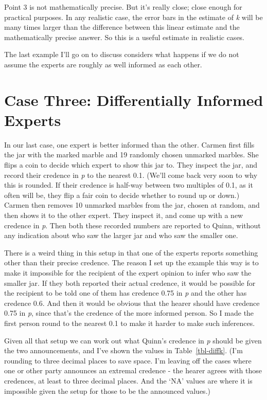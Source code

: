 \documentclass[
  11pt,
  letterpaper,
  DIV=11,
  numbers=noendperiod,
  twoside]{scrartcl}
\begin{document}
Point 3 is not mathematically precise. But it's really close; close
enough for practical purposes. In any realistic case, the error bars in
the estimate of \emph{k} will be many times larger than the difference
between this linear estimate and the mathematically precise answer. So
this is a useful estimate in realistic cases.

The last example I'll go on to discuss considers what happens if we do
not assume the experts are roughly as well informed as each other.

\section{Case Three: Differentially Informed
Experts}\label{sec-diffinfo}

In our last case, one expert is better informed than the other. Carmen
first fills the jar with the marked marble and 19 randomly chosen
unmarked marbles. She flips a coin to decide which expert to show this
jar to. They inspect the jar, and record their credence in \emph{p} to
the nearest 0.1. (We'll come back very soon to why this is rounded. If
their credence is half-way between two multiples of 0.1, as it often
will be, they flip a fair coin to decide whether to round up or down.)
Carmen then removes 10 unmarked marbles from the jar, chosen at random,
and then shows it to the other expert. They inspect it, and come up with
a new credence in \emph{p}. Then both these recorded numbers are
reported to Quinn, without any indication about who saw the larger jar
and who saw the smaller one.

There is a weird thing in this setup in that one of the experts reports
something other than their precise credence. The reason I set up the
example this way is to make it impossible for the recipient of the
expert opinion to infer who saw the smaller jar. If they both reported
their actual credence, it would be possible for the recipient to be told
one of them has credence 0.75 in \emph{p} and the other has credence
0.6. And then it would be obvious that the hearer should have credence
0.75 in \emph{p}, since that's the credence of the more informed person.
So I made the first person round to the nearest 0.1 to make it harder to
make such inferences.

Given all that setup we can work out what Quinn's credence in \emph{p}
should be given the two announcements, and I've shown the values in
Table~\ref{tbl-diffk}. (I'm rounding to three decimal places to save
space. I'm leaving off the cases where one or other party announces an
extremal credence - the hearer agrees with those credences, at least to
three decimal places. And the `NA' values are where it is impossible
given the setup for those to be the announced values.)
\end{document}
